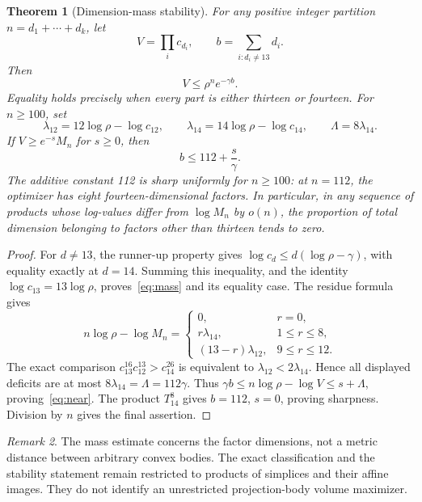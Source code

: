 \documentclass[11pt]{article}
\newtheorem{theorem}{Theorem}[section]
\theoremstyle{remark}\newtheorem{remark}[theorem]{Remark}
\begin{document}
\begin{theorem}[Dimension-mass stability]\label{thm:stability}
For any positive integer partition $n=d_1+\cdots+d_k$, let
\[
 V=\prod_i c_{d_i},\qquad b=\sum_{i:d_i\ne13}d_i.
\]
Then
\begin{equation}\label{eq:mass}
 \boxed{V\le\rho^n e^{-\gamma b}.}
\end{equation}
Equality holds precisely when every part is either thirteen or
fourteen. For $n\ge100$, set
\[
 \lambda_{12}=12\log\rho-\log c_{12},\qquad
 \lambda_{14}=14\log\rho-\log c_{14},\qquad
 \Lambda=8\lambda_{14}.
\]
If $V\ge e^{-s}M_n$ for $s\ge0$, then
\begin{equation}\label{eq:near}
 \boxed{b\le112+\frac{s}{\gamma}.}
\end{equation}
The additive constant 112 is sharp uniformly for $n\ge100$: at $n=112$, the optimizer has eight fourteen-dimensional factors. In particular, in any sequence of products whose log-values differ
from $\log M_n$ by $o(n)$, the proportion of total dimension belonging
to factors other than thirteen tends to zero.
\end{theorem}
\begin{proof}
For $d\ne13$, the runner-up property gives
$\log c_d\le d(\log\rho-\gamma)$, with equality exactly at $d=14$.
Summing this inequality, and the identity $\log c_{13}=13\log\rho$,
proves~\eqref{eq:mass} and its equality case. The residue formula gives
\[
 n\log\rho-\log M_n=
 \begin{cases}
 0,&r=0,\\
 r\lambda_{14},&1\le r\le8,\\
 (13-r)\lambda_{12},&9\le r\le12.
 \end{cases}
\]
The exact comparison $c_{13}^{16}c_{12}^{13}>c_{14}^{26}$ is equivalent to $\lambda_{12}<2\lambda_{14}$. Hence all displayed deficits are at most $8\lambda_{14}=\Lambda=112\gamma$. Thus
$\gamma b\le n\log\rho-\log V\le s+\Lambda$, proving~\eqref{eq:near}. The product $T_{14}^8$ gives $b=112$, $s=0$, proving sharpness.
Division by $n$ gives the final assertion.
\end{proof}

\begin{remark}
The mass estimate concerns the factor dimensions, not a metric distance
between arbitrary convex bodies. The exact classification and the
stability statement remain restricted to products of simplices and
their affine images. They do not identify an unrestricted projection-body
volume maximizer.
\end{remark}
\end{document}
